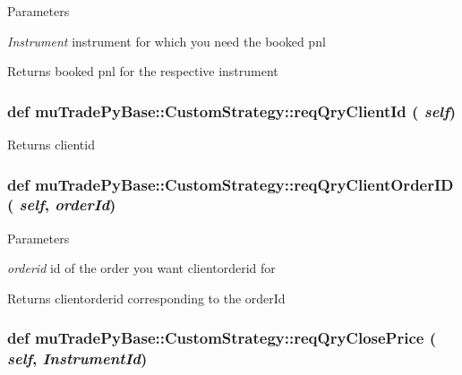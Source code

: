 \begin{DoxyParams}{Parameters}
\item[{\em Instrument}]instrument for which you need the booked pnl \end{DoxyParams}
\begin{DoxyReturn}{Returns}
booked pnl for the respective instrument 
\end{DoxyReturn}
\hypertarget{classmuTradePyBase_1_1CustomStrategy_aaa13aee1b0102ed8d6d5c78d18bed8cc}{
\subsubsection[{reqQryClientId}]{\setlength{\rightskip}{0pt plus 5cm}def muTradePyBase::CustomStrategy::reqQryClientId ( {\em self})}}
\label{classmuTradePyBase_1_1CustomStrategy_aaa13aee1b0102ed8d6d5c78d18bed8cc}
\begin{DoxyReturn}{Returns}
clientid 
\end{DoxyReturn}
\hypertarget{classmuTradePyBase_1_1CustomStrategy_a498436149088a84055d2d3793775956a}{
\subsubsection[{reqQryClientOrderID}]{\setlength{\rightskip}{0pt plus 5cm}def muTradePyBase::CustomStrategy::reqQryClientOrderID ( {\em self}, \/   {\em orderId})}}
\label{classmuTradePyBase_1_1CustomStrategy_a498436149088a84055d2d3793775956a}

\begin{DoxyParams}{Parameters}
\item[{\em orderid}]id of the order you want clientorderid for \end{DoxyParams}
\begin{DoxyReturn}{Returns}
clientorderid corresponding to the orderId 
\end{DoxyReturn}
\hypertarget{classmuTradePyBase_1_1CustomStrategy_ad402881274c2432ec5018c2e3da3c6cf}{
\subsubsection[{reqQryClosePrice}]{\setlength{\rightskip}{0pt plus 5cm}def muTradePyBase::CustomStrategy::reqQryClosePrice ( {\em self}, \/   {\em InstrumentId})}}
\label{classmuTradePyBase_1_1CustomStrategy_ad402881274c2432ec5018c2e3da3c6cf}

